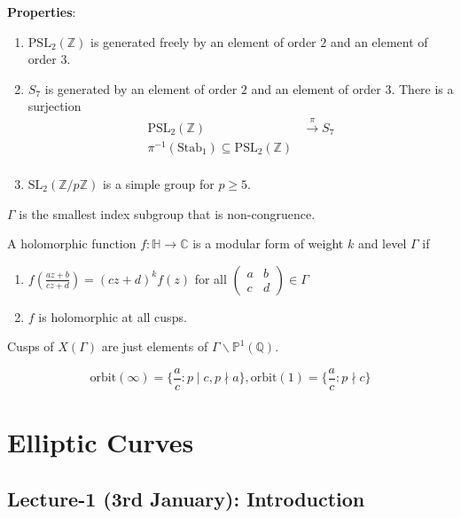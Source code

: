 \documentclass[oneside, 12pt, ]{scrbook}
\newcommand{\CC}{\mathbb C}
\newcommand{\QQ}{\mathbb Q}
\newcommand{\ZZ}{\mathbb Z}
\newcommand{\PP}{\mathbb{P}}
\newcommand{\SL}{\mathrm{SL}}
\theoremstyle{theorem}
\begin{document}
\textbf{Properties}:
\begin{enumerate}
\item $\mathrm{PSL}_{2}(\ZZ)$ is generated freely by an element of order $2$ and an element of order $3$.
\item $S_{7}$ is generated by an element of order $2$ and an element of order $3$. There is a surjection 
\begin{align*}
\mathrm{PSL}_{2}(\ZZ) &\xrightarrow{\pi} S_{7} \\
\pi^{-1}(\mathrm{Stab}_{1}) \subseteq \mathrm{PSL}_{2}(\ZZ) \\
\end{align*}
\item $\SL_{2}(\ZZ/p\ZZ)$ is a simple group for $p \geq 5$.
\end{enumerate}

\begin{remark}
$\Gamma$ is the smallest index subgroup that is non-congruence.
\end{remark}

\begin{definition}
A holomorphic function $f: \mathbb{H} \rightarrow \CC$ is a modular form of weight $k$ and level $\Gamma$ if 
\begin{enumerate}
\item $f\left(\frac{az+b}{cz+d}\right) = (cz+d)^k f(z)$ for all $\begin{pmatrix}
a & b \\ c & d
\end{pmatrix} \in \Gamma$
\item $f$ is holomorphic at all cusps.
\end{enumerate}
Cusps of $X(\Gamma)$ are just elements of $\Gamma \backslash \PP^1 (\QQ)$.
\end{definition}

\begin{proposition}
$$\mathrm{orbit}(\infty) = \{ \frac{a}{c}: p\mid c , p \nmid a\}, \mathrm{orbit}(1) = \{ \frac{a}{c}:p \nmid c\}$$
\end{proposition}




\part{Elliptic Curves}

\chapter{Lecture-1 (3rd January): Introduction }
\end{document}
